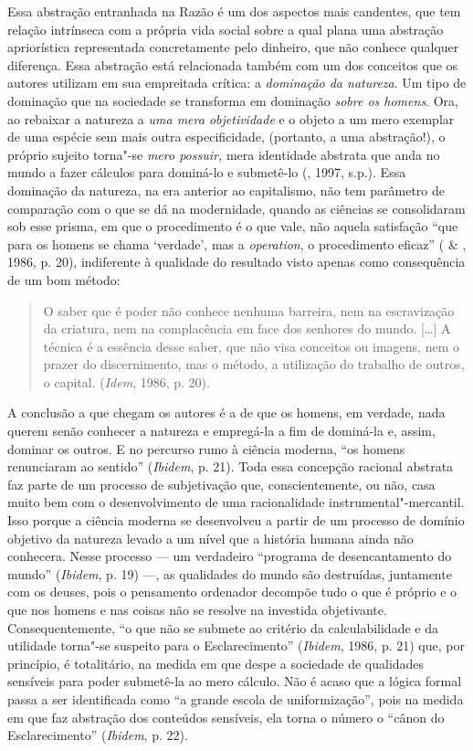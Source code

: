 Essa abstração entranhada na Razão é um dos aspectos mais candentes, que
tem relação intrínseca com a própria vida social sobre a qual plana uma
abstração apriorística representada concretamente pelo dinheiro, que não
conhece qualquer diferença. Essa abstração está relacionada também com
um dos conceitos que os autores utilizam em sua empreitada crítica: a
\emph{dominação da natureza}. Um tipo de dominação que na sociedade se
transforma em dominação \emph{sobre os homens}. Ora, ao rebaixar a
natureza a \emph{uma mera objetividade} e o objeto a um mero exemplar de
uma espécie sem mais outra especificidade, (portanto, a uma abstração!),
o próprio sujeito torna"-se \emph{mero possuir,} mera identidade abstrata
que anda no mundo a fazer cálculos para dominá-lo e submetê-lo (,
1997, s.p.). Essa dominação da natureza, na era anterior ao capitalismo,
não tem parâmetro de comparação com o que se dá na modernidade, quando
as ciências se consolidaram sob esse prisma, em que o procedimento é o
que vale, não aquela satisfação ``que para os homens se chama `verdade',
mas a \emph{operation}, o procedimento eficaz'' ( \& ,
1986, p. 20), indiferente à qualidade do resultado visto apenas como
consequência de um bom método:

\begin{quote}
O saber que é poder não conhece nenhuma barreira, nem na escravização da
criatura, nem na complacência em face dos senhores do mundo. [\ldots{}] A
técnica é a essência desse saber, que não visa conceitos ou imagens, nem
o prazer do discernimento, mas o método, a utilização do trabalho de
outros, o capital. (\emph{Idem}, 1986, p. 20).
\end{quote}

A conclusão a que chegam os autores é a de que os homens, em verdade,
nada querem senão conhecer a natureza e empregá-la a fim de dominá-la e,
assim, dominar os outros. E no percurso rumo à ciência moderna, ``os
homens renunciaram ao sentido'' (\emph{Ibidem}, p. 21). Toda essa
concepção racional abstrata faz parte de um processo de subjetivação
que, conscientemente, ou não, casa muito bem com o desenvolvimento de
uma racionalidade instrumental"-mercantil. Isso porque a ciência moderna
se desenvolveu a partir de um processo de domínio objetivo da natureza
levado a um nível que a história humana ainda não conhecera. Nesse
processo --- um verdadeiro ``programa de desencantamento do mundo''
(\emph{Ibidem}, p. 19) ---, as qualidades do mundo são destruídas,
juntamente com os deuses, pois o pensamento ordenador decompõe tudo o
que é próprio e o que nos homens e nas coisas não se resolve na
investida objetivante. Consequentemente, ``o que não se submete ao
critério da calculabilidade e da utilidade torna"-se suspeito para o
Esclarecimento'' (\emph{Ibidem}, 1986, p. 21) que, por princípio, é
totalitário, na medida em que despe a sociedade de qualidades sensíveis
para poder submetê-la ao mero cálculo. Não é acaso que a lógica formal
passa a ser identificada como ``a grande escola de uniformização'', pois
na medida em que faz abstração dos conteúdos sensíveis, ela torna o
número o ``cânon do Esclarecimento'' (\emph{Ibidem}, p. 22).

